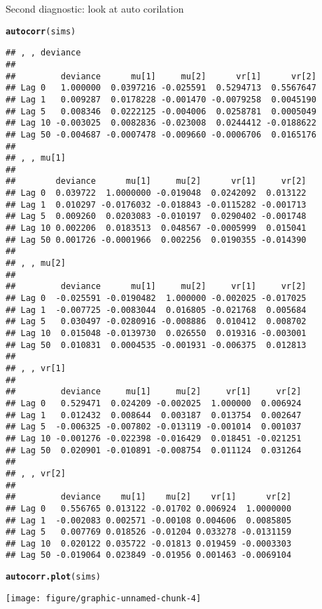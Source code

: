 \documentclass[12pt,letterpaper,oneside]{article}\usepackage{graphicx, color}
\makeatletter
\newcommand{\hlfunctioncall}[1]{\textcolor[rgb]{0.501960784313725,0,0.329411764705882}{\textbf{#1}}}%
\newenvironment{kframe}{%
 \def\at@end@of@kframe{}%
 \ifinner\ifhmode%
  \def\at@end@of@kframe{\end{minipage}}%
  \begin{minipage}{\columnwidth}%
 \fi\fi%
 \def\FrameCommand##1{\hskip\@totalleftmargin \hskip-\fboxsep
 \colorbox{shadecolor}{##1}\hskip-\fboxsep
     \hskip-\linewidth \hskip-\@totalleftmargin \hskip\columnwidth}%
 \MakeFramed {\advance\hsize-\width
   \@totalleftmargin\z@ \linewidth\hsize
   \@setminipage}}%
 {\par\unskip\endMakeFramed%
 \at@end@of@kframe}
\newenvironment{knitrout}{}{} %
\makeatother
\begin{document}
Second diagnostic: look at auto corilation
\begin{knitrout}\scriptsize
{}\color{fgcolor}\begin{kframe}
\begin{alltt}
\hlfunctioncall{autocorr}(sims)
\end{alltt}
\begin{verbatim}
## , , deviance
## 
##         deviance      mu[1]     mu[2]      vr[1]      vr[2]
## Lag 0   1.000000  0.0397216 -0.025591  0.5294713  0.5567647
## Lag 1   0.009287  0.0178228 -0.001470 -0.0079258  0.0045190
## Lag 5   0.008346  0.0222125 -0.004006  0.0258781  0.0005049
## Lag 10 -0.003025  0.0082836 -0.023008  0.0244412 -0.0188622
## Lag 50 -0.004687 -0.0007478 -0.009660 -0.0006706  0.0165176
## 
## , , mu[1]
## 
##        deviance      mu[1]     mu[2]      vr[1]     vr[2]
## Lag 0  0.039722  1.0000000 -0.019048  0.0242092  0.013122
## Lag 1  0.010297 -0.0176032 -0.018843 -0.0115282 -0.001713
## Lag 5  0.009260  0.0203083 -0.010197  0.0290402 -0.001748
## Lag 10 0.002206  0.0183513  0.048567 -0.0005999  0.015041
## Lag 50 0.001726 -0.0001966  0.002256  0.0190355 -0.014390
## 
## , , mu[2]
## 
##         deviance      mu[1]     mu[2]     vr[1]     vr[2]
## Lag 0  -0.025591 -0.0190482  1.000000 -0.002025 -0.017025
## Lag 1  -0.007725 -0.0083044  0.016805 -0.021768  0.005684
## Lag 5   0.030497 -0.0280916 -0.008886  0.010412  0.008702
## Lag 10  0.015048 -0.0139730  0.026550  0.019316 -0.003001
## Lag 50  0.010831  0.0004535 -0.001931 -0.006375  0.012813
## 
## , , vr[1]
## 
##         deviance     mu[1]     mu[2]     vr[1]     vr[2]
## Lag 0   0.529471  0.024209 -0.002025  1.000000  0.006924
## Lag 1   0.012432  0.008644  0.003187  0.013754  0.002647
## Lag 5  -0.006325 -0.007802 -0.013119 -0.001014  0.001037
## Lag 10 -0.001276 -0.022398 -0.016429  0.018451 -0.021251
## Lag 50  0.020901 -0.010891 -0.008754  0.011124  0.031264
## 
## , , vr[2]
## 
##         deviance    mu[1]    mu[2]    vr[1]      vr[2]
## Lag 0   0.556765 0.013122 -0.01702 0.006924  1.0000000
## Lag 1  -0.002083 0.002571 -0.00108 0.004606  0.0085805
## Lag 5   0.007769 0.018526 -0.01204 0.033278 -0.0131159
## Lag 10  0.020122 0.035722 -0.01813 0.019459 -0.0003303
## Lag 50 -0.019064 0.023849 -0.01956 0.001463 -0.0069104
\end{verbatim}
\begin{alltt}
\hlfunctioncall{autocorr.plot}(sims)
\end{alltt}
\end{kframe}

{\centering \texttt{[image: figure/graphic-unnamed-chunk-4]} 

}



\end{knitrout}
\end{document}
